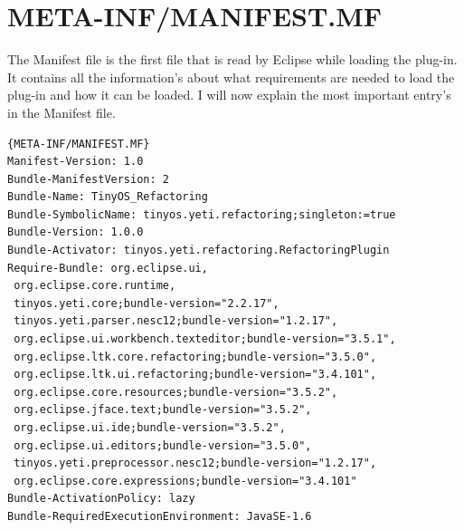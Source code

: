 \documentclass[a4paper,10pt]{report}
\begin{document}
\section{META-INF/MANIFEST.MF}
The Manifest file is the first file that is read by Eclipse while loading the plug-in. It contains all the information's about what requirements 
are needed to load the plug-in and how it can be loaded. I will now explain the most important entry's in the Manifest file.

\begin{lstlisting}[caption=MANIFEST]{META-INF/MANIFEST.MF}
Manifest-Version: 1.0
Bundle-ManifestVersion: 2
Bundle-Name: TinyOS_Refactoring
Bundle-SymbolicName: tinyos.yeti.refactoring;singleton:=true
Bundle-Version: 1.0.0
Bundle-Activator: tinyos.yeti.refactoring.RefactoringPlugin
Require-Bundle: org.eclipse.ui,
 org.eclipse.core.runtime,
 tinyos.yeti.core;bundle-version="2.2.17",
 tinyos.yeti.parser.nesc12;bundle-version="1.2.17",
 org.eclipse.ui.workbench.texteditor;bundle-version="3.5.1",
 org.eclipse.ltk.core.refactoring;bundle-version="3.5.0",
 org.eclipse.ltk.ui.refactoring;bundle-version="3.4.101",
 org.eclipse.core.resources;bundle-version="3.5.2",
 org.eclipse.jface.text;bundle-version="3.5.2",
 org.eclipse.ui.ide;bundle-version="3.5.2",
 org.eclipse.ui.editors;bundle-version="3.5.0",
 tinyos.yeti.preprocessor.nesc12;bundle-version="1.2.17",
 org.eclipse.core.expressions;bundle-version="3.4.101"
Bundle-ActivationPolicy: lazy
Bundle-RequiredExecutionEnvironment: JavaSE-1.6
\end{lstlisting}
\end{document}
